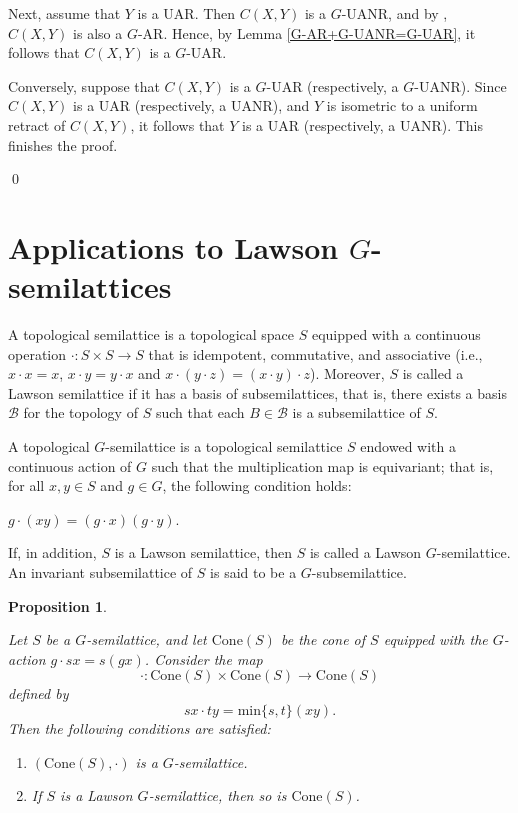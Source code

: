 \documentclass[12pt]{amsart}
\newtheorem{theorem}{Theorem}[section]
\newtheorem{proposition}[theorem]{Proposition}
\theoremstyle{definition}
\begin{document}
		Next, assume that $Y$ is a UAR. Then $C(X,Y)$ is a $G$-UANR, and by \cite[Theorem 8]{A3}, $C(X,Y)$ is also a $G$-AR. Hence, by Lemma \ref{G-AR+G-UANR=G-UAR}, it follows that $C(X,Y)$ is a $G$-UAR.
		
		Conversely, suppose that $C(X,Y)$ is a $G$-UAR (respectively, a $G$-UANR). Since $C(X,Y)$ is a UAR (respectively, a UANR), and $Y$ is isometric to a uniform retract of $C(X,Y)$, it follows that $Y$ is a UAR (respectively, a UANR). This finishes the proof.
		
	\qed
	
	
	
	\section{Applications to Lawson \texorpdfstring{$G$-}-semilattices}\label{sec4}
	
	A topological semilattice is a topological space $S$ equipped with a continuous operation $\cdot: S\times S\rightarrow S$ that is idempotent, commutative, and associative (i.e., $x\cdot x=x$, $x\cdot y=y\cdot x$ and $x\cdot (y\cdot z)=(x\cdot y)\cdot z$). Moreover, $S$ is called a Lawson semilattice if it has a basis of subsemilattices, that is, there exists a basis $\mathcal{B}$ for the topology of $S$ such that each $B\in \mathcal{B}$ is a subsemilattice of $S$.  
	
	A topological $G$-semilattice is a topological semilattice $S$ endowed with a continuous action of $G$ such that the multiplication map is equivariant; that is, for all $x,y \in S$ and $g \in G$, the following condition holds:
	\begin{center}
		$g\cdot(xy)=(g\cdot x)(g\cdot y)$.
	\end{center}
	
	If, in addition, $S$ is a Lawson semilattice, then $S$ is called a Lawson $G$-semilattice. An invariant subsemilattice of $S$ is said to be a $G$-subsemilattice.
			
	\begin{proposition}\label{Cone(X)semilattice}
		\rm{Let $S$ be a $G$-semilattice, and let $\mathrm{Cone}(S)$ be the cone of $S$ equipped with the $G$-action $g\cdot sx=s(gx)$. Consider the map 
		$$\cdot: \mathrm{Cone}(S)\times \mathrm{Cone}(S)\rightarrow \mathrm{Cone}(S)$$
		 defined by 
		 $$sx\cdot ty=\mbox{min}\{s,t\}(xy).$$ 
		 Then the following conditions are satisfied:
			
			\begin{enumerate}
				\item [(i)] $(\mathrm{Cone}(S),\cdot)$ is a $G$-semilattice.
				\item [(ii)] If $S$ is a Lawson $G$-semilattice, then so is $\mathrm{Cone}(S)$.
		\end{enumerate}}
	\end{proposition}
	
\end{document}
